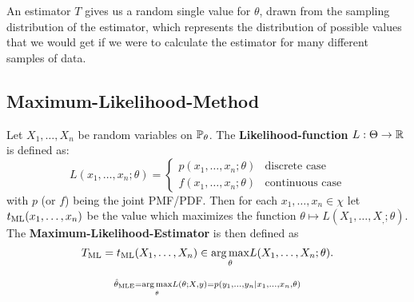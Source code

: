 An estimator $T$ gives us a random single value for $\theta$, drawn from the sampling distribution of the estimator, which represents the distribution of possible values that we would get if we were to calculate the estimator for many different samples of data.

\subsection{Maximum-Likelihood-Method}
Let \(X_1, \ldots, X_n\) be random variables on \(\P_\theta\). The \textbf{Likelihood-function} \(L: \Theta \to \R\) is defined as:
\[L(x_1, \ldots, x_n ; \theta) = \begin{cases}
  p(x_1, \ldots, x_n ; \theta) & \text{discrete case} \\
  f(x_1, \ldots, x_n ; \theta) & \text{continuous case}
\end{cases}\]
with \(p\) (or \(f\)) being the joint PMF/PDF.
Then for each \(x_1, \ldots, x_n \in \chi\) let \(t_{\ML}(x_1, \ldots, x_n)\) be the value which maximizes the function \(\theta \mapsto L(X_1, \ldots, X_, ; \theta)\).
The \textbf{Maximum-Likelihood-Estimator} is then defined as
\[T_{\ML} = t_{\ML}(X_1, \ldots, X_n) \in \underset{\theta}{\arg\max} L(X_1, \ldots, X_n ; \theta).\]

\vspace{-10pt}
\begin{note*}
  \[\scriptstyle \hat{\theta}_{\MLE} = \underset{\theta}{\arg\max} L(\theta; X, y) = p(y_1, \ldots, y_n \mid x_1, \ldots, x_n, \theta)\]
\end{note*}
